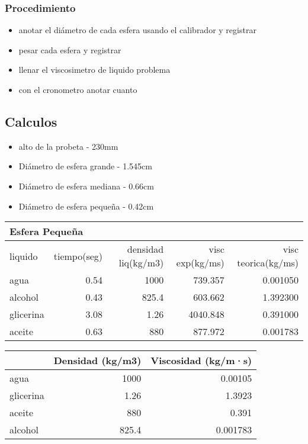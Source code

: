 \documentclass[11pt, letterpaper]{article}
\begin{document}
\subsubsection{Procedimiento}
\begin{itemize}
	\item anotar el diámetro de cada esfera usando el calibrador y registrar
	\item pesar cada esfera y registrar
	\item llenar el viscosimetro de liquido problema
	\item con el cronometro anotar cuanto
\end{itemize}
\subsection{Calculos}
\begin{itemize}
	\item alto de la probeta - 230mm
	\item Diámetro de esfera grande - 1.545cm
	\item Diámetro de esfera mediana - 0.66cm
	\item Diámetro de esfera pequeña - 0.42cm
\end{itemize}
\begin{center}
    \begin{tabular}{|p{6.93em}|r|r|r|r|}
    \toprule
    \multicolumn{5}{|p{38.285em}|}{Esfera Pequeña} \\
    \midrule
    liquido & \multicolumn{1}{p{6.57em}|}{tiempo(seg)} & \multicolumn{1}{p{6.57em}|}{densidad liq(kg/m3)} & \multicolumn{1}{p{9.5em}|}{visc exp(kg/ms)} & \multicolumn{1}{p{8.715em}|}{visc teorica(kg/ms)} \\
    \midrule
    agua  & 0.54  & 1000  & 739.357 & 0.001050 \\
    \midrule
    alcohol & 0.43  & 825.4 & 603.662 & 1.392300 \\
    \midrule
    glicerina & 3.08  & 1.26  & 4040.848 & 0.391000 \\
    \midrule
    aceite & 0.63  & 880   & 877.972 & 0.001783 \\
    \bottomrule
    \end{tabular}%
  \label{tab:addlabel}%
\end{center}%
\begin{center}
    \begin{tabular}{|l|r|r|}
\cmidrule{2-3}    \multicolumn{1}{c|}{} & \multicolumn{1}{c|}{Densidad (kg/m3)} & \multicolumn{1}{c|}{Viscosidad (kg/m·s)} \\
    \midrule
    agua  & 1000  & 0.00105 \\
    \midrule
    glicerina & 1.26  & 1.3923 \\
    \midrule
    aceite & 880   & 0.391 \\
    \midrule
    alcohol & 825.4 & 0.001783 \\
    \bottomrule
    \end{tabular}%
  \label{tab:addlabel}%
\end{center}%
\end{document}
